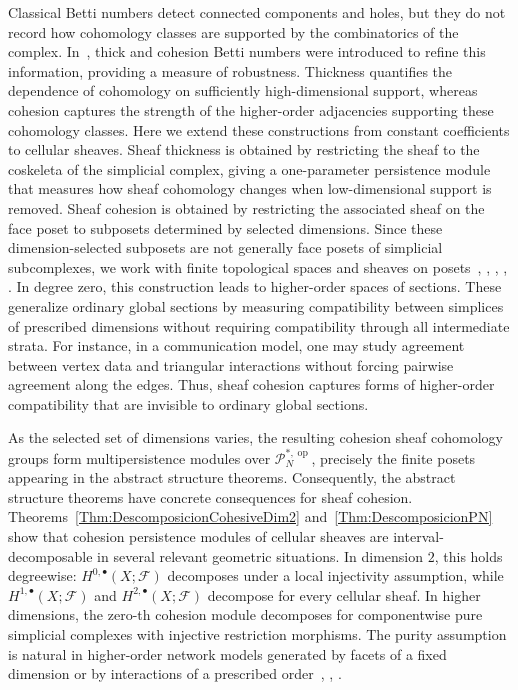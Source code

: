 \documentclass[reqno,12pt]{amsart}
\newcommand{\cF}{{\mathcal F}}
\newcommand{\cP}{\mathcal{P}}
\DeclareMathOperator{\op}{op}
\newcommand{\0}{\mathbf 0}
\theoremstyle{definition}
\begin{document}
Classical Betti numbers detect connected components and holes, but they do not record how cohomology classes are supported by the combinatorics of the complex. In~\cite{Pablo_Dani_Dario_25}, thick and cohesion Betti numbers were introduced to refine this information, providing a measure of robustness. Thickness quantifies the dependence of cohomology on sufficiently high-dimensional support, whereas cohesion captures the strength of the higher-order adjacencies supporting these cohomology classes. Here we extend these constructions from constant coefficients to cellular sheaves. Sheaf thickness is obtained by restricting the sheaf to the coskeleta of the simplicial complex, giving a one-parameter persistence module that measures how sheaf cohomology changes when low-dimensional support is removed. Sheaf cohesion is obtained by restricting the associated sheaf on the face poset to subposets determined by selected dimensions. Since these dimension-selected subposets are not generally face posets of simplicial subcomplexes, we work with finite topological spaces and sheaves on posets~\cite{Barmak11}, \cite{Carmona_Fernando_Maestro_Juanfran20}, \cite{Curry14}, \cite{Fernando_17}, \cite{Shepard85}.  In degree zero, this construction leads to higher-order spaces of sections. These generalize ordinary global sections by measuring compatibility between simplices of prescribed dimensions without requiring compatibility through all intermediate strata. For instance, in a communication model, one may study agreement between vertex data and triangular interactions without forcing pairwise agreement along the edges. Thus, sheaf cohesion captures forms of higher-order compatibility that are invisible to ordinary global sections.

As the selected set of dimensions varies, the resulting cohesion sheaf cohomology groups form multipersistence modules over $\cP_N^{*,\op}$, precisely the finite posets appearing in the abstract structure theorems. Consequently, the abstract structure theorems have concrete consequences for sheaf cohesion. 
Theorems~\ref{Thm:DescomposicionCohesiveDim2} and~\ref{Thm:DescomposicionPN} show that cohesion persistence modules of cellular sheaves are interval-decomposable in several relevant geometric situations. In dimension $2$, this holds degreewise: $H^{0,\bullet}(X;\cF)$ decomposes under a local injectivity assumption, while $H^{1,\bullet}(X;\cF)$ and $H^{2,\bullet}(X;\cF)$ decompose for every cellular sheaf. In higher dimensions, the zero-th cohesion module decomposes for componentwise pure simplicial complexes with injective restriction morphisms. The purity assumption is natural in higher-order network models generated by facets of a fixed dimension or by interactions of a prescribed order~\cite{Bianconi_Rahmede16}, \cite{Courtney_Bianconi16}, \cite{Courtney_Bianconi17}.
\end{document}
